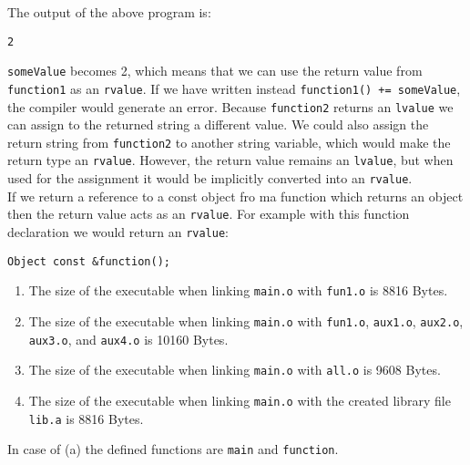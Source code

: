\documentclass[a4paper]{article}
\newcounter{exerciseCount}
\newcommand{\exercise}[1]{\addtocounter{exerciseCount}{1} \noindent \medskip {\large \textsf{\textbf{Exercise \arabic{exerciseCount} #1}}} \par}
\begin{document}
The output of the above program is:

\begin{verbatim}
2
\end{verbatim}

\verb|someValue| becomes 2, which means that we can use the return value from \verb|function1| as an \verb|rvalue|. If we have written instead \verb|function1() += someValue|, the compiler would generate an error. Because \verb|function2| returns an \verb|lvalue| we can assign to the returned string a different value. We could also assign the return string from \verb|function2| to another string variable, which would make the return type an \verb|rvalue|. However, the return value remains an \verb|lvalue|, but when used for the assignment it would be implicitly converted into an \verb|rvalue|.\\

If we return a reference to a const object fro ma function which returns an object then the return value acts as an \verb|rvalue|. For example with this function declaration we would return an \verb|rvalue|:

\begin{verbatim}
Object const &function();
\end{verbatim}

\vspace{1em}

\exercise{} %







\begin{enumerate}
	\item The size of the executable when linking \verb|main.o| with \verb|fun1.o| is 8816 Bytes.
	\item The size of the executable when linking \verb|main.o| with \verb|fun1.o|, \verb|aux1.o|, \verb|aux2.o|, \verb|aux3.o|, and \verb|aux4.o| is 10160 Bytes.
	\item The size of the executable when linking \verb|main.o| with \verb|all.o| is 9608 Bytes.
	\item The size of the executable when linking \verb|main.o| with the created library file \verb|lib.a| is 8816 Bytes.
\end{enumerate}

In case of (a) the defined functions are \verb|main| and \verb|function|.\\
\end{document}
